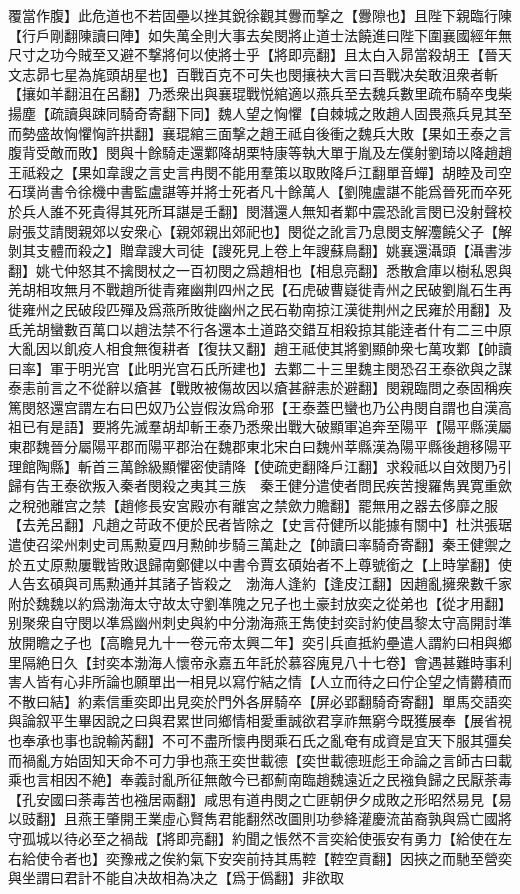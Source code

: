 覆當作腹】此危道也不若固壘以挫其銳徐觀其釁而撃之【釁隙也】且陛下親臨行陳【行戶剛翻陳讀曰陣】如失萬全則大事去矣閔將止道士法饒進曰陛下圍襄國經年無尺寸之功今賊至又避不撃將何以使將士乎【將即亮翻】且太白入昴當殺胡王【晉天文志昴七星為旄頭胡星也】百戰百克不可失也閔攘袂大言曰吾戰决矣敢沮衆者斬【攘如羊翻沮在呂翻】乃悉衆出與襄琨戰悦綰適以燕兵至去魏兵數里疏布騎卒曳柴揚塵【疏讀與踈同騎奇寄翻下同】魏人望之恟懼【自棘城之敗趙人固畏燕兵見其至而勢盛故恟懼恟許拱翻】襄琨綰三面撃之趙王祗自後衝之魏兵大敗【果如王泰之言腹背受敵而敗】閔與十餘騎走還鄴降胡栗特康等執大單于胤及左僕射劉琦以降趙趙王祗殺之【果如韋謏之言史言冉閔不能用羣策以取敗降戶江翻單音蟬】胡睦及司空石璞尚書令徐機中書監盧諶等并將士死者凡十餘萬人【劉隗盧諶不能爲晉死而卒死於兵人誰不死貴得其死所耳諶是壬翻】閔潛還人無知者鄴中震恐訛言閔已没射聲校尉張艾請閔親郊以安衆心【親郊親出郊祀也】閔從之訛言乃息閔支解灋饒父子【解剝其支體而殺之】贈韋謏大司徒【謏死見上卷上年謏蘇鳥翻】姚襄還灄頭【灄書涉翻】姚弋仲怒其不擒閔杖之一百初閔之爲趙相也【相息亮翻】悉散倉庫以樹私恩與羌胡相攻無月不戰趙所徙青雍幽荆四州之民【石虎破曹嶷徙青州之民破劉胤石生再徙雍州之民破段匹殫及爲燕所敗徙幽州之民石勒南掠江漢徙荆州之民雍於用翻】及氐羌胡蠻數百萬口以趙法禁不行各還本土道路交錯互相殺掠其能逹者什有二三中原大亂因以飢疫人相食無復耕者【復扶又翻】趙王祗使其將劉顯帥衆七萬攻鄴【帥讀曰率】軍于明光宫【此明光宫石氏所建也】去鄴二十三里魏主閔恐召王泰欲與之謀泰恚前言之不從辭以瘡甚【戰敗被傷故因以瘡甚辭恚於避翻】閔親臨問之泰固稱疾篤閔怒還宫謂左右曰巴奴乃公豈假汝爲命邪【王泰蓋巴蠻也乃公冉閔自謂也自漢高祖已有是語】要將先滅羣胡却斬王泰乃悉衆出戰大破顯軍追奔至陽平【陽平縣漢屬東郡魏晉分屬陽平郡而陽平郡治在魏郡東北宋白曰魏州莘縣漢為陽平縣後趙移陽平理館陶縣】斬首三萬餘級顯懼密使請降【使疏吏翻降戶江翻】求殺祗以自效閔乃引歸有告王泰欲叛入秦者閔殺之夷其三族　秦王健分遣使者問民疾苦搜羅雋異寛重歛之稅弛離宫之禁【趙修長安宮殿亦有離宮之禁歛力贍翻】罷無用之器去侈靡之服【去羌呂翻】凡趙之苛政不便於民者皆除之【史言苻健所以能據有關中】杜洪張琚遣使召梁州刺史司馬勲夏四月勲帥步騎三萬赴之【帥讀曰率騎奇寄翻】秦王健禦之於五丈原勲屢戰皆敗退歸南鄭健以中書令賈玄碩始者不上尊號銜之【上時掌翻】使人告玄碩與司馬勲通并其諸子皆殺之　渤海人逢約【逢皮江翻】因趙亂擁衆數千家附於魏魏以約爲渤海太守故太守劉凖隗之兄子也土豪封放奕之從弟也【從才用翻】别聚衆自守閔以凖爲幽州刺史與約中分渤海燕王雋使封奕討約使昌黎太守高開討準放開瞻之子也【高瞻見九十一卷元帝太興二年】奕引兵直抵約壘遣人謂約曰相與鄉里隔絶日久【封奕本渤海人懷帝永嘉五年託於慕容廆見八十七卷】會遇甚難時事利害人皆有心非所論也願單出一相見以寫佇結之情【人立而待之曰佇企望之情欝積而不散曰結】約素信重奕即出見奕於門外各屏騎卒【屏必郢翻騎奇寄翻】單馬交語奕與論叙平生畢因說之曰與君累世同鄉情相愛重誠欲君享祚無窮今既獲展奉【展省視也奉承也事也說輸芮翻】不可不盡所懷冉閔乘石氏之亂奄有成資是宜天下服其彊矣而禍亂方始固知天命不可力爭也燕王奕世載德【奕世載德班彪王命論之言師古曰載乘也言相因不絶】奉義討亂所征無敵今已都薊南臨趙魏遠近之民襁負歸之民厭荼毒【孔安國曰荼毒苦也襁居兩翻】咸思有道冉閔之亡匪朝伊夕成敗之形昭然易見【易以豉翻】且燕王肇開王業虛心賢雋君能翻然改圖則功參絳灌慶流苖裔孰與爲亡國將守孤城以待必至之禍哉【將即亮翻】約聞之悵然不言奕給使張安有勇力【給使在左右給使令者也】奕豫戒之俟約氣下安突前持其馬鞚【鞚空貢翻】因挾之而馳至營奕與坐謂曰君計不能自决故相為决之【爲于僞翻】非欲取